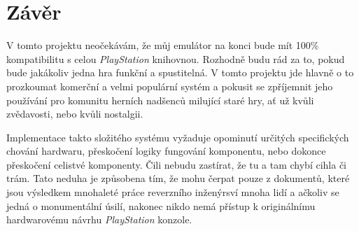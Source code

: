\chapter{Závěr}

V tomto projektu neočekávám, že můj emulátor na konci bude mít 100\% kompatibilitu s celou \textit{PlayStation} knihovnou.
Rozhodně budu rád za to, pokud bude jakákoliv jedna hra funkční a spustitelná. V tomto projektu jde hlavně o to prozkoumat
komerční a velmi populární systém a pokusit se zpříjemnit jeho používání pro komunitu herních nadšenců milující staré hry, 
ať už kvůli zvědavosti, nebo kvůli nostalgii.

Implementace takto složitého systému vyžaduje opominutí určitých specifických chování hardwaru, přeskočení logiky fungování
komponentu, nebo dokonce přeskočení celistvé komponenty. Čili nebudu zastírat, že tu a tam chybí cihla či trám. Tato neduha
je způsobena tím, že mohu čerpat pouze z dokumentů, které jsou výsledkem mnohaleté práce reverzního
inženýrsví mnoha lidí a ačkoliv se jedná o monumentální úsilí, nakonec nikdo nemá přístup k originálnímu
hardwarovému návrhu \textit{PlayStation} konzole. 
